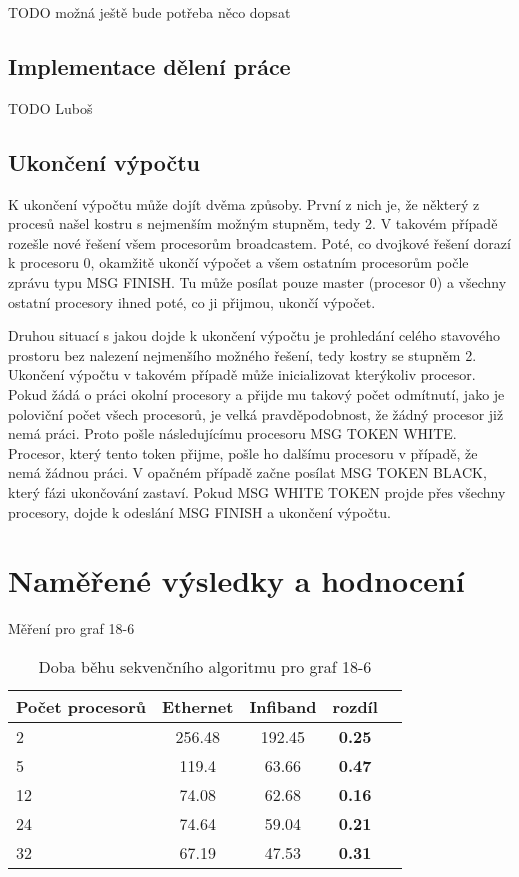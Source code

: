 \documentclass[]{article}
\begin{document}
TODO možná ještě bude potřeba něco dopsat

\subsection{Implementace dělení práce}

TODO Luboš

\subsection{Ukončení výpočtu}

K ukončení výpočtu může dojít dvěma způsoby. První z nich je, že některý z procesů našel kostru s nejmenším možným stupněm, tedy 2. V takovém případě rozešle nové řešení všem procesorům broadcastem. Poté, co dvojkové řešení dorazí k procesoru 0, okamžitě ukončí výpočet a všem ostatním procesorům počle zprávu typu MSG FINISH. Tu může posílat pouze master (procesor 0) a všechny ostatní procesory ihned poté, co ji přijmou, ukončí výpočet.

Druhou situací s jakou dojde k ukončení výpočtu je prohledání celého stavového prostoru bez nalezení nejmenšího možného řešení, tedy kostry se stupněm 2. Ukončení výpočtu v takovém případě může inicializovat kterýkoliv procesor. Pokud žádá o práci okolní procesory a přijde mu takový počet odmítnutí, jako je poloviční počet všech procesorů, je velká pravděpodobnost, že žádný procesor již nemá práci. Proto pošle následujícímu procesoru MSG TOKEN WHITE. Procesor, který tento token přijme, pošle ho dalšímu procesoru v případě, že nemá žádnou práci. V opačném případě začne posílat MSG TOKEN BLACK, který fázi ukončování zastaví. Pokud MSG WHITE TOKEN projde přes všechny procesory, dojde k odeslání MSG FINISH a ukončení výpočtu.

\section{Naměřené výsledky a hodnocení}

Měření pro graf 18-6

\begin{table}[ht]
\centering
\begin{tabular}{|l|c|c|c|c|}
\hline \textbf{Počet procesorů} & \textbf{Ethernet} & \textbf{Infiband} & \textbf{rozdíl} \\
\hline 
\hline 2 & 256.48 & 192.45 & \textbf{0.25} \\ 
\hline 5 & 119.4 & 63.66 & \textbf{0.47} \\ 
\hline 12 & 74.08 & 62.68 &  \textbf{0.16} \\ 
\hline 24 & 74.64 & 59.04 &  \textbf{0.21} \\ 
\hline 32 & 67.19 & 47.53 &  \textbf{0.31} \\ 
\hline 
\end{tabular}
\caption{Doba běhu sekvenčního algoritmu pro graf 18-6}
\label{sekvencni_test}	
\end{table}
\end{document}
